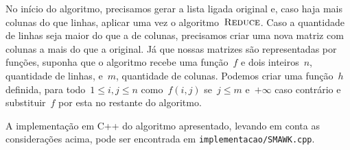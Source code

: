 No início do algoritmo, precisamos gerar a lista ligada original e, caso haja mais colunas do que linhas, aplicar uma vez o algoritmo~$\textsc{Reduce}$. Caso a quantidade de linhas seja maior do que a de colunas, precisamos criar uma nova matriz com colunas a mais do que a original. Já que nossas matrizes são representadas por funções, suponha que o algoritmo recebe uma função~$f$ e dois inteiros~$n$, quantidade de linhas, e~$m$, quantidade de colunas. Podemos criar uma função~$h$ definida, para todo~$1 \leq i,j \leq n$ como~$f(i,j)$ se~$j \leq m$ e~$+\infty$ caso contrário e substituir~$f$ por esta no restante do algoritmo.

A implementação em C++ do algoritmo apresentado, levando em conta as considerações acima, pode ser encontrada em \texttt{implementacao/SMAWK.cpp}.


